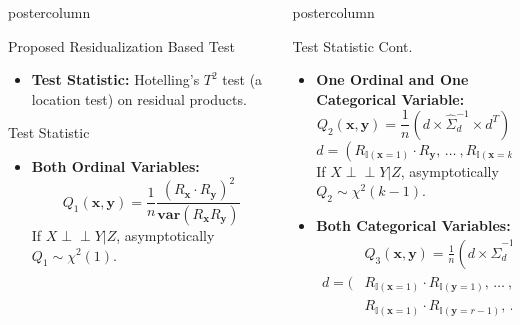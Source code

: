 \documentclass{beamer}
\def\ci{\perp\!\!\!\!\!\perp}
\newlength{\columnheight}
\begin{document}
\begin{frame}
\begin{columns}
\begin{column}{.33\textwidth}
\begin{beamercolorbox}[center]{postercolumn}
\begin{minipage}{.98\textwidth}
{\begin{myblock}{Proposed Residualization Based Test}
\begin{itemize}
								For the conditional case for sample $ (y|z)_i $,
								$$ R_{y_i | z_i} = \hat{p}(Y < y_i | Z=z_i) - \hat{p}(Y>y_i|Z=z_i) $$
							\item \textbf{Test Statistic:} Hotelling's $ T^2 $ test (a location test) on residual products.
						\end{itemize}
					\end{myblock}\vfill
					\begin{myblock}{Test Statistic}
						\begin{itemize}
							\setlength\itemsep{0.5em}
							\item \textbf{Both Ordinal Variables:}
							$$ Q_1(\bm{x}, \bm{y}) = \frac{1}{n} \frac{(R_{\bm{x}} \cdot R_{\bm{y}})^2}{\bm{var}(R_{\bm{x}} R_{\bm{y}})} $$
							If $ X \ci Y | Z $, asymptotically $ Q_1 \sim \chi^2(1) $.
						\end{itemize}
					\end{myblock}\vfill
		}\end{minipage}\end{beamercolorbox}
	\end{column}
	\begin{column}{.33\textwidth}
		\begin{beamercolorbox}[center]{postercolumn}
			\begin{minipage}{.98\textwidth} %
				\parbox[t][\columnheight]{\textwidth}{ %
					\begin{myblock}{Test Statistic Cont.}
						\begin{itemize}
							\setlength\itemsep{0.5em}
							\item \textbf{One Ordinal and One Categorical Variable:}
										$$ Q_2(\bm{x}, \bm{y}) = \frac{1}{n} (d \times \hat{\Sigma}_d^{-1} \times d^T) $$
										$$ d = (R_{\mathbb{I}(\mathbf{x}=1)} \cdot R_{\mathbf{y}}, \, \ldots \ , R_{\mathbb{I}(\mathbf{x}=k-1)} \cdot R_{\mathbf{y}}) $$
								If $ X \ci Y | Z $, asymptotically $ Q_2 \sim \chi^2(k-1) $.
							\item \textbf{Both Categorical Variables:}
							\begin{equation*}
								\begin{split}
									& Q_3(\bm{x}, \bm{y}) = \frac{1}{n} (d \times \hat{\Sigma}_d^{-1} \times d^T) \\
								d = (&R_{\mathbb{I}(\mathbf{x}=1)} \cdot R_{\mathbb{I}(\mathbf{y}=1)}, \, \ldots \ ,
										R_{\mathbb{I}(\mathbf{x}=k-1)} R_{\mathbb{I}(\mathbf{y}=1)}, \, \ldots \, , \\
								     &R_{\mathbb{I}(\mathbf{x}=1)} \cdot R_{\mathbb{I}(\mathbf{y}=r-1)}, \, \ldots \ ,
										R_{\mathbb{I}(\mathbf{x}=k-1)} R_{\mathbb{I}(\mathbf{y}=r-1)}) 
								\end{split}
							\end{equation*}
							

\end{itemize}
\end{myblock}}
\end{minipage}
\end{beamercolorbox}
\end{column}
\end{columns}
\end{frame}
\end{document}
